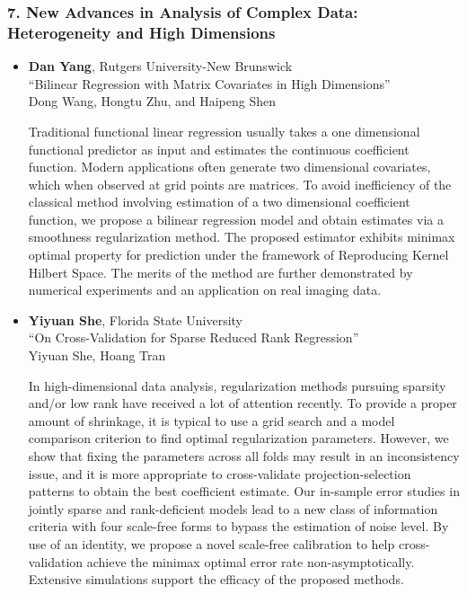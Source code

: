 \begin{itemize}
\end{itemize}

\subsubsection*{7. New Advances in Analysis of Complex Data: Heterogeneity and High Dimensions}

\begin{itemize}
\item \textbf{Dan Yang}, Rutgers University-New Brunswick \\
``Bilinear Regression with Matrix Covariates in High Dimensions'' \\
Dong Wang, Hongtu Zhu, and Haipeng Shen


Traditional functional linear regression usually takes a one dimensional functional predictor as input and estimates the continuous coefficient function. Modern applications often generate two dimensional covariates, which when observed at grid points are matrices. To avoid inefficiency of the classical method involving estimation of a two dimensional coefficient function, we propose a bilinear regression model and obtain estimates via a smoothness regularization method. The proposed estimator exhibits minimax optimal property for prediction under the framework of Reproducing Kernel Hilbert Space. The merits of the method are further demonstrated by numerical experiments and an application on real imaging data. 

\item \textbf{Yiyuan She}, Florida State University \\
``On Cross-Validation for Sparse Reduced Rank Regression'' \\
Yiyuan She, Hoang Tran


In high-dimensional data analysis, regularization methods pursuing sparsity and/or low rank have received a lot of attention recently.  To provide a proper amount of shrinkage, it is typical to use a grid search and a model comparison criterion to find optimal regularization parameters. However, we show that fixing the parameters   across all folds may result in an inconsistency issue, and  it is more appropriate to cross-validate projection-selection patterns to obtain the best coefficient estimate. Our     in-sample error studies in jointly sparse and rank-deficient models lead to a new class of information criteria with four scale-free forms to bypass the estimation of  noise level. By use of an identity, we propose a novel scale-free  calibration to help cross-validation achieve the minimax optimal error rate non-asymptotically. Extensive simulations support the efficacy of the proposed methods.

\end{itemize}

